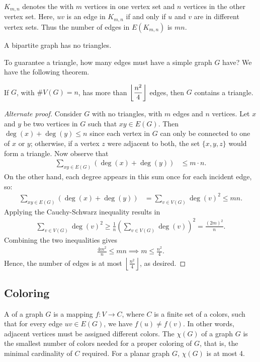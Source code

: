 $K_{m,n}$ denotes the  with $m$ vertices in one vertex set and $n$ vertices in the other vertex set. Here, $uv$ is an edge in $K_{m,n}$ if and only if $u$ and $v$ are in different vertex sets. Thus the number of edges in $E(K_{m,n})$ is $mn$.

\begin{corollary}
    A bipartite graph has no triangles.
\end{corollary}

To guarantee a triangle, how many edges must have a simple graph $G$ have? We have the following theorem.

\begin{theorem}
    If $G$, with $\#V(G) = n$, has more than $\left\lfloor \dfrac{n^{2}}{4} \right\rfloor$ edges, then $G$ contains a triangle.
\end{theorem}

\begin{proof}[Alternate proof]
    Consider $G$ with no triangles, with $m$ edges and $n$ vertices. Let $x$ and $y$ be two vertices in $G$ such that $xy \in E(G)$. Then $\deg(x) + \deg(y) \leq n$ since each vertex in $G$ can only be connected to one of $x$ or $y$; otherwise, if a vertex $z$ were adjacent to both, the set $\{x, y, z\}$ would form a triangle. Now observe that
    \begin{align}
        \sum_{xy \in E(G)} \left( \deg(x) + \deg(y) \right) &\leq m \cdot n.
    \end{align}
    On the other hand, each degree appears in this sum once for each incident edge, so:
    \begin{align}
        \sum_{xy \in E(G)} \left( \deg(x) + \deg(y) \right) &= \sum_{v \in V(G)} \deg(v)^2 \leq mn.
    \end{align}
    Applying the Cauchy-Schwarz inequality results in
    \begin{align}
        \sum_{v \in V(G)} \deg(v)^2 \geq \frac{1}{n} \left( \sum_{v \in V(G)} \deg(v) \right)^2 = \frac{(2m)^2}{n}.
    \end{align}
    Combining the two inequalities gives
    \begin{align}
        \frac{4m^2}{n} \leq m n \implies m \leq \frac{n^2}{4}.
    \end{align}
    Hence, the number of edges is at most $\left\lfloor \frac{n^2}{4} \right\rfloor$, as desired.
\end{proof}

\subsection{Coloring}
A  of a graph $G$ is a mapping $f:V \to C$, where $C$ is a finite set of a colors, such that for every edge $uv \in E(G)$, we have $f(u) \neq f(v)$. In other words, adjacent vertices must be assigned different colors. The  $\chi(G)$ of a graph $G$ is the smallest number of colors needed for a proper coloring of $G$, that is, the minimal cardinality of $C$ required. For a planar graph $G$, $\chi(G)$ is at most 4.

